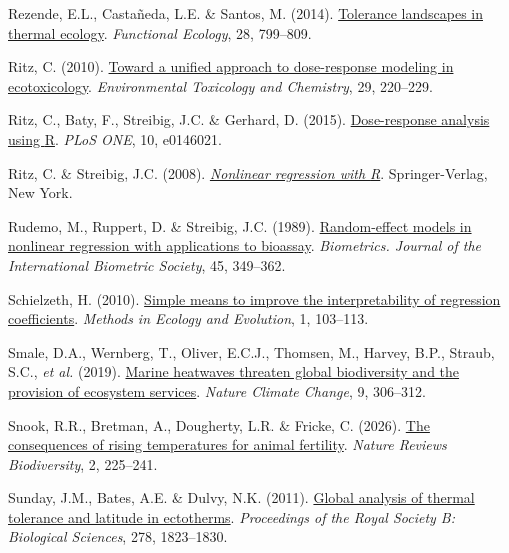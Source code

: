 \documentclass[
  11pt,
]{article}
\newlength{\cslhangindent}
\newenvironment{CSLReferences}[2] %
 {\begin{list}{}{%
  \setlength{\itemindent}{0pt}
  \setlength{\leftmargin}{0pt}
  \setlength{\parsep}{0pt}
  \ifodd #1
   \setlength{\leftmargin}{\cslhangindent}
   \setlength{\itemindent}{-1\cslhangindent}
  \fi
  \setlength{\itemsep}{#2\baselineskip}}}
 {\end{list}}
\begin{document}
\begin{CSLReferences}{1}{0}
Rezende, E.L., Castañeda, L.E. \& Santos, M. (2014).
\href{https://doi.org/10.1111/1365-2435.12268}{Tolerance landscapes in
thermal ecology}. \emph{Functional Ecology}, 28, 799--809.

Ritz, C. (2010). \href{https://doi.org/10.1002/etc.7}{Toward a unified
approach to dose-response modeling in ecotoxicology}.
\emph{Environmental Toxicology and Chemistry}, 29, 220--229.

Ritz, C., Baty, F., Streibig, J.C. \& Gerhard, D. (2015).
\href{https://doi.org/10.1371/journal.pone.0146021}{Dose-response
analysis using {R}}. \emph{PLoS ONE}, 10, e0146021.

Ritz, C. \& Streibig, J.C. (2008).
\emph{\href{https://doi.org/10.1007/978-0-387-09616-2}{Nonlinear
regression with {R}}}. Springer-Verlag, New York.

Rudemo, M., Ruppert, D. \& Streibig, J.C. (1989).
\href{https://doi.org/10.2307/2531483}{Random-effect models in nonlinear
regression with applications to bioassay}. \emph{Biometrics. Journal of
the International Biometric Society}, 45, 349--362.

Schielzeth, H. (2010).
\href{https://doi.org/10.1111/j.2041-210X.2010.00012.x}{Simple means to
improve the interpretability of regression coefficients}. \emph{Methods
in Ecology and Evolution}, 1, 103--113.

Smale, D.A., Wernberg, T., Oliver, E.C.J., Thomsen, M., Harvey, B.P.,
Straub, S.C., \emph{et al.} (2019).
\href{https://doi.org/10.1038/s41558-019-0412-1}{Marine heatwaves
threaten global biodiversity and the provision of ecosystem services}.
\emph{Nature Climate Change}, 9, 306--312.

Snook, R.R., Bretman, A., Dougherty, L.R. \& Fricke, C. (2026).
\href{https://doi.org/10.1038/s44358-026-00142-4}{The consequences of
rising temperatures for animal fertility}. \emph{Nature Reviews
Biodiversity}, 2, 225--241.

Sunday, J.M., Bates, A.E. \& Dulvy, N.K. (2011).
\href{https://doi.org/10.1098/rspb.2010.1295}{Global analysis of thermal
tolerance and latitude in ectotherms}. \emph{Proceedings of the Royal
Society B: Biological Sciences}, 278, 1823--1830.


\end{CSLReferences}
\end{document}
